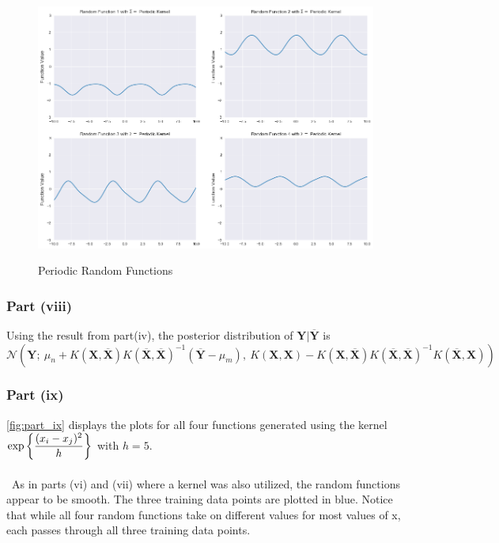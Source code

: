 \documentclass[twoside,11pt]{homework}
\DeclarePairedDelimiter{\2norm}{\lVert}{\rVert^2_2}
\newcommand{\1}[1]{\mathds{1}\left[#1\right]}
\begin{document}
\begin{figure}[H]
\centering
\caption{Periodic Random Functions}
\includegraphics[scale=0.4]{"../code/figures/part_vii"}
\label{fig:part_vii}
\end{figure}




\vspace{0.15in}

\subsubsection*{Part (viii)}

Using the result from part(iv), the posterior distribution of $\textbf{Y}\vert\overline{\textbf{Y}}$ is 
$$\mathcal{N}\left(\textbf{Y}; \ \mu_n  +  K(\textbf{X}, \overline{\textbf{X}})K(\overline{\textbf{X}} , \overline{\textbf{X}})^{-1}\left(\overline{\textbf{Y}} - \mu_m\right)  , \ K(\textbf{X}, \textbf{X}) - K(\textbf{X}, \overline{\textbf{X}})K(\overline{\textbf{X}} , \overline{\textbf{X}})^{-1} K(\overline{\textbf{X}},\textbf{X})  \right)$$

\vspace{0.1in}


\subsubsection*{Part (ix)}

\autoref{fig:part_ix} displays the plots for all four functions generated using the kernel $\mathlarger{\text{exp}\left\lbrace\frac{(x_i - x_j)^2}{h}\right\rbrace}$ with $h = 5$. \\\ \\\
As in parts (vi) and (vii) where a kernel was also utilized, the random functions appear to be smooth. The three training data points are plotted in blue. Notice that while all four random functions take on different values for most values of x, each passes through all three training data points. 
\end{document}
